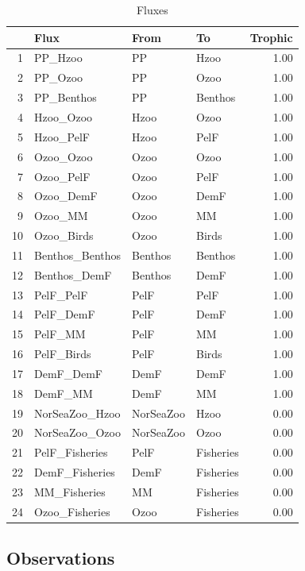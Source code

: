 \documentclass{article}
\begin{document}
\begin{table}[ht]
\centering
\begin{tabular}{rlllr}
  \hline
 & Flux & From & To & Trophic \\ 
  \hline
1 & PP\_Hzoo & PP & Hzoo & 1.00 \\ 
  2 & PP\_Ozoo & PP & Ozoo & 1.00 \\ 
  3 & PP\_Benthos & PP & Benthos & 1.00 \\ 
  4 & Hzoo\_Ozoo & Hzoo & Ozoo & 1.00 \\ 
  5 & Hzoo\_PelF & Hzoo & PelF & 1.00 \\ 
  6 & Ozoo\_Ozoo & Ozoo & Ozoo & 1.00 \\ 
  7 & Ozoo\_PelF & Ozoo & PelF & 1.00 \\ 
  8 & Ozoo\_DemF & Ozoo & DemF & 1.00 \\ 
  9 & Ozoo\_MM & Ozoo & MM & 1.00 \\ 
  10 & Ozoo\_Birds & Ozoo & Birds & 1.00 \\ 
  11 & Benthos\_Benthos & Benthos & Benthos & 1.00 \\ 
  12 & Benthos\_DemF & Benthos & DemF & 1.00 \\ 
  13 & PelF\_PelF & PelF & PelF & 1.00 \\ 
  14 & PelF\_DemF & PelF & DemF & 1.00 \\ 
  15 & PelF\_MM & PelF & MM & 1.00 \\ 
  16 & PelF\_Birds & PelF & Birds & 1.00 \\ 
  17 & DemF\_DemF & DemF & DemF & 1.00 \\ 
  18 & DemF\_MM & DemF & MM & 1.00 \\ 
  19 & NorSeaZoo\_Hzoo & NorSeaZoo & Hzoo & 0.00 \\ 
  20 & NorSeaZoo\_Ozoo & NorSeaZoo & Ozoo & 0.00 \\ 
  21 & PelF\_Fisheries & PelF & Fisheries & 0.00 \\ 
  22 & DemF\_Fisheries & DemF & Fisheries & 0.00 \\ 
  23 & MM\_Fisheries & MM & Fisheries & 0.00 \\ 
  24 & Ozoo\_Fisheries & Ozoo & Fisheries & 0.00 \\ 
   \hline
\end{tabular}
\caption{Fluxes} 
\label{Fluxes}
\end{table}
\subsection{Observations}
\end{document}
